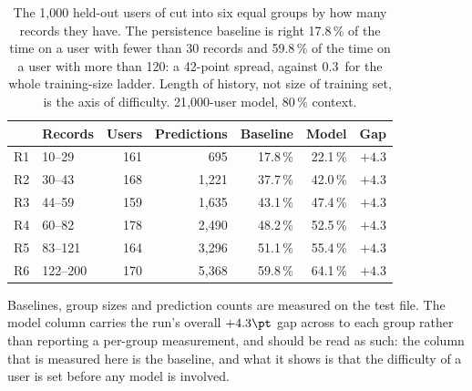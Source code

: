 \begin{table}[t]
\centering\small
\caption[Accuracy by record count]{The 1{,}000 held-out users of \seleven{} cut
into six equal groups by how many records they have. The persistence baseline is
right 17.8\,\% of the time on a user with fewer than 30 records and 59.8\,\% of
the time on a user with more than 120: a 42-point spread, against 0.3\pt\ for
the whole training-size ladder. Length of history, not size of training set, is
the axis of difficulty. 21{,}000-user model, 80\,\% context.}
\label{tab:record-count}
\begin{tabular}{@{}llrrrrr@{}}
\toprule
& \textbf{Records} & \textbf{Users} & \textbf{Predictions} & \textbf{Baseline} & \textbf{Model} & \textbf{Gap} \\
\midrule
R1 & 10--29   & 161 &   695 & 17.8\,\% & 22.1\,\% & $+4.3$ \\
R2 & 30--43   & 168 & 1{,}221 & 37.7\,\% & 42.0\,\% & $+4.3$ \\
R3 & 44--59   & 159 & 1{,}635 & 43.1\,\% & 47.4\,\% & $+4.3$ \\
R4 & 60--82   & 178 & 2{,}490 & 48.2\,\% & 52.5\,\% & $+4.3$ \\
R5 & 83--121  & 164 & 3{,}296 & 51.1\,\% & 55.4\,\% & $+4.3$ \\
R6 & 122--200 & 170 & 5{,}368 & 59.8\,\% & 64.1\,\% & $+4.3$ \\
\bottomrule
\end{tabular}

\vspace{3pt}
\begin{minipage}{\textwidth}\footnotesize
Baselines, group sizes and prediction counts are measured on the test file. The
model column carries the run's overall $+4.3\pt$ gap across to each group
rather than reporting a per-group measurement, and should be read as such: the
column that is measured here is the baseline, and what it shows is that the
difficulty of a user is set before any model is involved.
\end{minipage}
\end{table}
